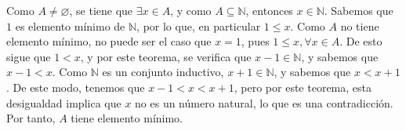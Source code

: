 \documentclass[11pt]{article}
\newcommand{\N}{\mathbb{N}}
\newcommand{\defined}{\coloneqq}
\let\emptyset\varnothing
\let\set\Set
\let\subset\subseteq
\let\intersection\cap
\begin{document}
\begin{enumerate}[label=\alph*)]
\begin{enumerate}[label=\roman*)]
  Como $A\neq \emptyset$, se tiene que $\exists x\in A$, y como $A\subset \N$, entonces $x\in \N$. Sabemos que $1$ es elemento mínimo de $\N$, por lo que, en particular $1\leq x$. Como $A$ no tiene elemento mínimo, no puede ser el caso que $x=1$, pues $1\leq x,\forall x\in A$. De esto sigue que $1<x$, y por este teorema, se verifica que $x-1\in \N$, y sabemos que $x-1<x$. Como $\N$ es un conjunto inductivo, $x+1\in \N$, y sabemos que $x<x+1$. De este modo, tenemos que $x-1<x<x+1$, pero por este teorema, esta desigualdad implica que $x$ no es un número natural, lo que es una contradicción. Por tanto, $A$ tiene elemento mínimo.
  

\end{enumerate}
\end{enumerate}
\end{document}
